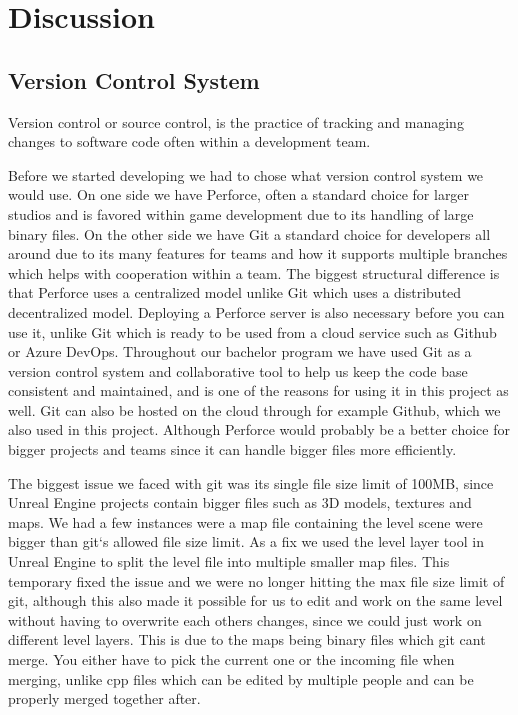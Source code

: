 \section{Discussion}


\subsection{Version Control System}
Version control or source control, is the practice of tracking and managing changes to software code often within a development team\cite{what_is_version_control}.

Before we started developing we had to chose what version control system we would use. On one side we have Perforce, often a standard choice for larger studios and is favored within game development due to its handling of large binary files. On the other side we have Git a standard choice for developers all around due to its many features for teams and how it supports multiple branches which helps with cooperation within a team. The biggest structural difference is that Perforce uses a centralized model unlike Git which uses a distributed decentralized model. Deploying a Perforce server is also necessary before you can use it, unlike Git which is ready to be used from a cloud service such as Github or Azure DevOps. 
Throughout our bachelor program we have used Git as a version control system and collaborative tool to help us keep the code base consistent and maintained, and is one of the reasons for using it in this project as well. Git can also be hosted on the cloud through for example Github, which we also used in this project. Although Perforce would probably be a better choice for bigger projects and teams since it can handle bigger files more efficiently\cite{different_version_control_used_in_gamedev}.

The biggest issue we faced with git was its single file size limit of 100MB, since Unreal Engine projects contain bigger files such as 3D models, textures and maps. We had a few instances were a map file containing the level scene were bigger than git`s allowed file size limit. As a fix we used the level layer tool in Unreal Engine to split the level file into multiple smaller map files. This temporary fixed the issue and we were no longer hitting the max file size limit of git, although this also made it possible for us to edit and work on the same level without having to overwrite each others changes, since we could just work on different level layers. This is due to the maps being binary files which git cant merge. You either have to pick the current one or the incoming file when merging, unlike cpp files which can be edited by multiple people and can be properly merged together after. 

